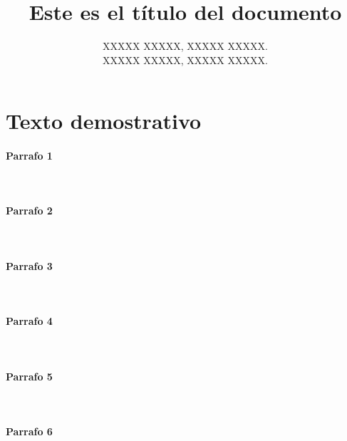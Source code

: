 
%
%


\title{Este es el título del documento}

\author{XXXXX XXXXX, XXXXX XXXXX.  \par XXXXX XXXXX, XXXXX XXXXX.}
\date{\the\year}

\usepackage{lipsum}


    \maketitle
    \tableofcontents
    \newpage

    \section{Texto demostrativo}
    \paragraph{Parrafo 1}
    \lipsum[1]\\
    \paragraph{Parrafo 2}
    \lipsum[2]\\
    \paragraph{Parrafo 3}
    \lipsum[3]\\
    \paragraph{Parrafo 4}
    \lipsum[4]\\
    \paragraph{Parrafo 5}
    \lipsum[5]\\
    \paragraph{Parrafo 6}
    \lipsum[6]\\


